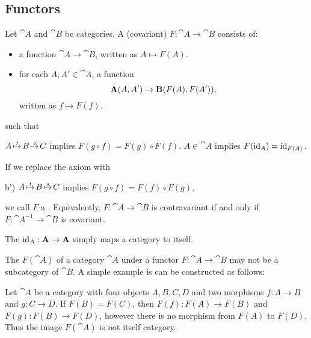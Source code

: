 \subsection{Functors}\label{subsec:functors}

\begin{definition}\label{def:functor}
  Let \( \cat{A} \) and \( \cat{B} \) be categories. A (covariant)  \( F: \cat{A} \to \cat{B} \) consists of:
  \begin{itemize}
    \item a function \( \cat{A} \to \cat{B} \), written as \( A \mapsto F(A) \).
    \item for each \( A, A' \in \cat{A} \), a function
          \begin{equation*}
            \operatorname{\mathbf{A}}(A, A') \to \operatorname{\mathbf{B}}(F(A), F(A')),
          \end{equation*}
          written as \( f \mapsto F(f) \).
  \end{itemize}
  such that
  \begin{thmenum}
     \( A \reloset f \mapsto B \reloset g \mapsto C \) implies \( F(g \circ f) = F(g) \circ F(f) \).
     \( A \in \cat{A} \) implies \( F(\operatorname{id}_A) = \operatorname{id}_{F(A)} \).
  \end{thmenum}

  If we replace the axiom  with
  \begin{thmenum}
    \item[b')]\label{def:functor/contravariant_composition_axiom} \( A \reloset f \mapsto B \reloset g \mapsto C \) implies \( F(g \circ f) = F(f) \circ F(g) \),
  \end{thmenum}
  we call \( F \) a . Equivalently, \( F: \cat{A} \to \cat{B} \) is contravariant if and only if \( F: \cat{A}^{-1} \to \cat{B} \) is covariant.

  The  \( \operatorname{id}_A: \operatorname{\mathbf{A}} \to \operatorname{\mathbf{A}} \) simply maps a category to itself.
\end{definition}

\begin{remark}\label{rem:image_of_functor_maybe_not_subcategory}
  The  \( F(\cat{A}) \) of a category \( \cat{A} \) under a functor \( F: \cat{A} \to \cat{B} \) may not be a subcategory of \( \cat{B} \). A simple example is can be constructed as follows:

  Let \( \cat{A} \) be a category with four objects \( A, B, C, D \) and two morphisms \( f: A \to B \) and \( g: C \to D \). If \( F(B) = F(C) \), then \( F(f): F(A) \to F(B) \) and \( F(g): F(B) \to F(D) \), however there is no morphism from \( F(A) \) to \( F(D) \). Thus the image \( F(\cat{A}) \) is not itself category.
\end{remark}

